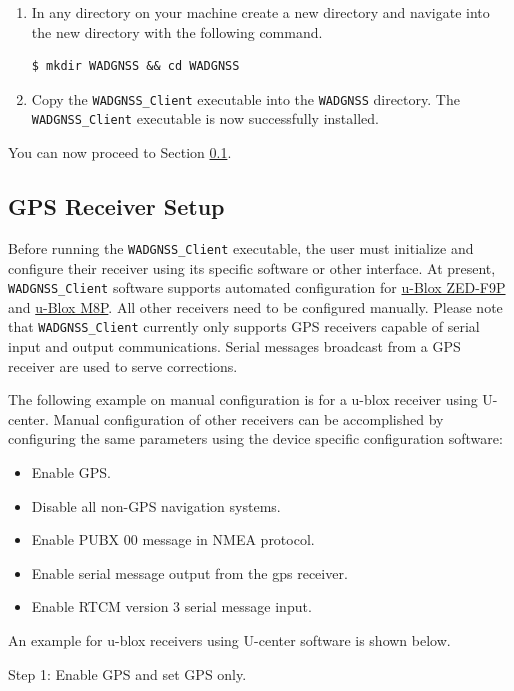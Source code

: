 \begin{enumerate}
\item In any directory on your machine create a new directory and  navigate into the new directory with the following command.
\begin{verbatim}
$ mkdir WADGNSS && cd WADGNSS 
\end{verbatim}

\item Copy the \texttt{WADGNSS\_Client} executable into the  \texttt{WADGNSS} directory. 
The \texttt{WADGNSS\_Client} executable is now successfully installed.
\end{enumerate}
You can now proceed to Section \ref{sect:RcvrSetup}.




\subsection{GPS Receiver Setup}\label{sect:RcvrSetup}
Before running the \texttt{WADGNSS\_Client} executable, the user must initialize and configure their receiver using its specific software or other interface. At present, \texttt{WADGNSS\_Client} software supports automated configuration for \href{module}{u-Blox ZED-F9P} and \href{module}{u-Blox M8P}. All other receivers need to be configured manually. Please note that \texttt{WADGNSS\_Client} currently only supports GPS receivers capable of serial input and output communications. Serial messages broadcast from a GPS receiver are used to serve corrections.

The following example on manual configuration is for a u-blox receiver using U-center. 
Manual configuration of other receivers can be accomplished by configuring the same parameters using the device specific configuration software:
\begin{itemize}
\item Enable GPS.
\item Disable all non-GPS navigation systems.
\item Enable PUBX 00 message in NMEA protocol.
\item Enable serial message output from the gps receiver. 
\item Enable RTCM version 3 serial message input.
\end{itemize}

An example for u-blox receivers using U-center software is shown below.

Step 1: Enable GPS and set GPS only.
 

